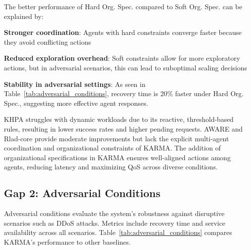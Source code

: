 \documentclass[conference]{IEEEtran}
\begin{document}
The better performance of Hard Org. Spec. compared to Soft Org. Spec. can be explained by:
\begin{enumerate*}[label=\textbf{\arabic*)}, itemjoin={;\quad }]
    \item \textbf{Stronger coordination}: Agents with hard constraints converge faster because they avoid conflicting actions
    \item \textbf{Reduced exploration overhead}: Soft constraints allow for more exploratory actions, but in adversarial scenarios, this can lead to suboptimal scaling decisions
    \item \textbf{Stability in adversarial settings}: As seen in Table~\ref{tab:adversarial_conditions}, recovery time is 20\% faster under Hard Org. Spec., suggesting more effective agent responses.
\end{enumerate*}

KHPA struggles with dynamic workloads due to its reactive, threshold-based rules, resulting in lower success rates and higher pending requests. AWARE and Rlad-core provide moderate improvements but lack the explicit multi-agent coordination and organizational constraints of KARMA. The addition of organizational specifications in KARMA ensures well-aligned actions among agents, reducing latency and maximizing QoS across diverse conditions.

\subsection{Gap 2: Adversarial Conditions}
Adversarial conditions evaluate the system's robustness against disruptive scenarios such as DDoS attacks. Metrics include recovery time and service availability across all scenarios. Table~\ref{tab:adversarial_conditions} compares KARMA's performance to other baselines.
\end{document}

